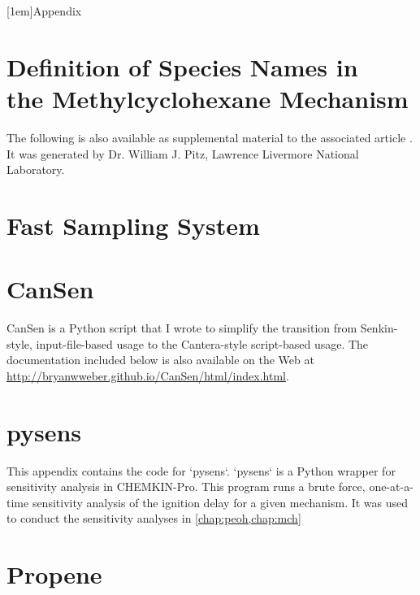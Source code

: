 \documentclass[12pt,letterpaper,oneside,final]{book}
\begin{document}
\begin{appendices}
\makeatletter
\addappheadtotoc
{}
[1em]{}{Appendix \thecontentslabel\quad}{}{\contentspage}
%
\makeatother
{}

\chapter[Definition of Species Names in the Methylcyclohexane Mechanism]%
{Definition of Species Names in\\the Methylcyclohexane Mechanism}
\label{app:mch-dict}
The following is also available as supplemental material to the associated article \cite{Weber2014}.
It was generated by Dr. William J. Pitz, Lawrence Livermore National Laboratory.



\chapter{Fast Sampling System}
\label{app:fast-sampling-system}



\chapter{CanSen}
\label{app:cansen}
CanSen is a Python script that I wrote to simplify the transition from
Senkin-style, input-file-based usage to the Cantera-style script-based usage.
The documentation included below is also available on the Web at
\url{http://bryanwweber.github.io/CanSen/html/index.html}.



\chapter{pysens}
\label{app:pysens}
This appendix contains the code for `pysens`. `pysens` is a Python wrapper
for sensitivity analysis in CHEMKIN-Pro. This program runs a brute
force, one-at-a-time sensitivity analysis of the ignition delay for a
given mechanism. It was used to conduct the sensitivity analyses in
\cref{chap:peoh,chap:mch}

\blankline



\chapter{Propene}
\label{app:propene}


\end{appendices}
\end{document}
